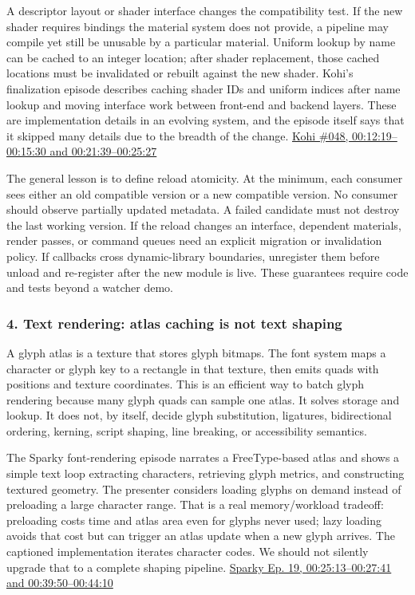 A descriptor layout or shader interface changes the compatibility test. If the new shader requires bindings the material system does not provide, a pipeline may compile yet still be unusable by a particular material. Uniform lookup by name can be cached to an integer location; after shader replacement, those cached locations must be invalidated or rebuilt against the new shader. Kohi's finalization episode describes caching shader IDs and uniform indices after name lookup and moving interface work between front-end and backend layers. These are implementation details in an evolving system, and the episode itself says that it skipped many details due to the breadth of the change. \href{https://www.youtube.com/watch?v=9nP3aBsrCXs&t=12m19s}{Kohi \#048, 00:12:19--00:15:30 and 00:21:39--00:25:27}

The general lesson is to define reload atomicity. At the minimum, each consumer sees either an old compatible version or a new compatible version. No consumer should observe partially updated metadata. A failed candidate must not destroy the last working version. If the reload changes an interface, dependent materials, render passes, or command queues need an explicit migration or invalidation policy. If callbacks cross dynamic-library boundaries, unregister them before unload and re-register after the new module is live. These guarantees require code and tests beyond a watcher demo.

\subsubsection{4. Text rendering: atlas caching is not text shaping}\label{text-rendering-atlas-caching-is-not-text-shaping}

A glyph atlas is a texture that stores glyph bitmaps. The font system maps a character or glyph key to a rectangle in that texture, then emits quads with positions and texture coordinates. This is an efficient way to batch glyph rendering because many glyph quads can sample one atlas. It solves storage and lookup. It does not, by itself, decide glyph substitution, ligatures, bidirectional ordering, kerning, script shaping, line breaking, or accessibility semantics.

The Sparky font-rendering episode narrates a FreeType-based atlas and shows a simple text loop extracting characters, retrieving glyph metrics, and constructing textured geometry. The presenter considers loading glyphs on demand instead of preloading a large character range. That is a real memory/workload tradeoff: preloading costs time and atlas area even for glyphs never used; lazy loading avoids that cost but can trigger an atlas update when a new glyph arrives. The captioned implementation iterates character codes. We should not silently upgrade that to a complete shaping pipeline. \href{https://www.youtube.com/watch?v=Rsdc6I80aFQ&t=25m13s}{Sparky Ep. 19, 00:25:13--00:27:41 and 00:39:50--00:44:10}

